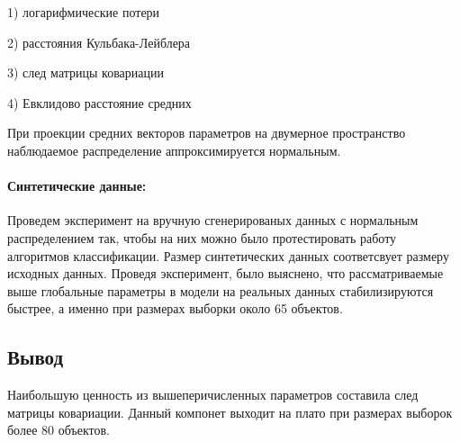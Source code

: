 \documentclass[12pt,twoside]{article}
\begin{document}
1) логарифмические потери

2) расстояния Кульбака-Лейблера

3) след матрицы ковариации

4) Евклидово расстояние средних

При проекции средних векторов параметров на двумерное пространство наблюдаемое распределение аппроксимируется нормальным.
\paragraph{Синтетические данные:}
Проведем эксперимент на вручную сгенерированых данных с нормальным распределением так, чтобы на них можно было протестировать работу алгоритмов классификации.
Размер синтетических данных соответсвует размеру исходных данных. Проведя эксперимент, было выяснено, что рассматриваемые выше глобальные параметры в модели на реальных данных стабилизируются быстрее, а именно при размерах выборки около 65 объектов. 
\subsection{}
\subsection{Вывод}
Наибольшую ценность из вышеперичисленных параметров составила след матрицы ковариации. Данный компонет выходит на плато при размерах выборок более 80 объектов.
\subsection{}





\nocite{*}
\end{document}
